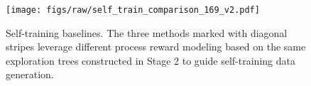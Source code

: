 
\begin{figure}[tb]
    \centering
    \texttt{[image: figs/raw/self\_train\_comparison\_169\_v2.pdf]}
        \vspace{-30pt}
        \caption{Self-training baselines. The three methods marked with diagonal stripes leverage different process reward modeling based on the same exploration trees constructed in Stage 2 to guide self-training data generation.}
        \vspace{-9pt}
        \label{fig:self_train+prm}
\end{figure}